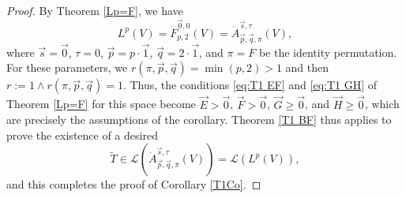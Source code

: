 \documentclass[11pt, reqno]{amsart}
\theoremstyle{definition}
\theoremstyle{remark}
\numberwithin{equation}{section}
\newcommand{\vone}{\vec 1}
\newcommand{\vp}{\vec p}
\newcommand{\vq}{\vec q}
\newcommand{\vs}{\vec s}
\newcommand{\Atau}{\dot A^{\vs,\tau}_{\vp,\vq,\pi}}
\begin{document}
\begin{proof}
By Theorem  \ref{Lp=F}, we have
\begin{equation*}
  L^p(V)=\dot F^{\vec0,0}_{p,2}(V)=\Atau(V),
\end{equation*}
where $\vec s=\vec0$, $\tau=0$, $\vec p=p\cdot\vone$, $\vec q=2\cdot\vone$, and $\pi=F$ be the identity permutation. For these parameters, we $r(\pi,\vp,\vq)=\min(p,2)>1$ and then $r:=1\wedge r(\pi,\vp,\vq)=1$.
Thus, the conditions \eqref{eq:T1 EF} and \eqref{eq:T1 GH} of Theorem \ref{Lp=F} for this space
become $\vec E>\vec0$, $\vec F>\vec0$, $\vec G\geq\vec 0$,
and $\vec H\geq\vec 0$, which are precisely the assumptions of the corollary.
Theorem \ref{T1 BF} thus applies to prove the existence of a desired
\begin{equation*}
  \widetilde T\in\mathcal L(\Atau(V))=\mathcal L(L^p(V)),
\end{equation*}
and this completes the proof of Corollary \ref{T1Co}.
\end{proof}
\end{document}
